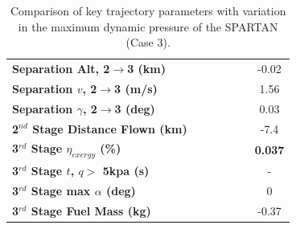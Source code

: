 \begin{table}[ht!]
\begin{tabular}{l c c c c c c}
	\textbf{Separation Alt, 2$\rightarrow$3 (km)}
	& \secondthirdSeparationAltqFortyNoReturn
	& \secondthirdSeparationAltqFortyFiveNoReturn
	& \secondthirdSeparationAltqStandardNoReturn
	& \secondthirdSeparationAltqFiftyFiveNoReturn
	& \secondthirdSeparationAltqSixtyNoReturn
	&-0.02
	\\
	\textbf{Separation $v$, 2$\rightarrow$3 (m/s)}
	& \secondthirdSeparationvqFortyNoReturn
	& \secondthirdSeparationvqFortyFiveNoReturn
	& \secondthirdSeparationvqStandardNoReturn
	& \secondthirdSeparationvqFiftyFiveNoReturn
	& \secondthirdSeparationvqSixtyNoReturn
	&1.56
	\\
	\textbf{Separation $\gamma$, 2$\rightarrow$3 (deg)}
	& \secondthirdSeparationgammaqFortyNoReturn
	& \secondthirdSeparationgammaqFortyFiveNoReturn
	& \secondthirdSeparationgammaqStandardNoReturn
	& \secondthirdSeparationgammaqFiftyFiveNoReturn
	& \secondthirdSeparationgammaqSixtyNoReturn
	&0.03
	\\
	\textbf{2$^{nd}$ Stage Distance Flown (km)}
	& \SecondDistqFortyNoReturn
	& \SecondDistqFortyFiveNoReturn
	& \SecondDistqStandardNoReturn
	& \SecondDistqFiftyFiveNoReturn
	& \SecondDistqSixtyNoReturn
	&-7.4
	\\
	\hline 
	\textbf{3$^{rd}$ Stage $\eta_{exergy}$ (\%)}
	& \textbf{\thirddExergyEffqFortyNoReturn}
	& \textbf{\thirddExergyEffqFortyFiveNoReturn}
	& \textbf{\thirddExergyEffqStandardNoReturn}
	& \textbf{\thirddExergyEffqFiftyFiveNoReturn}
	& \textbf{\thirddExergyEffqSixtyNoReturn}
	& \textbf{0.037}
	\\

	\textbf{3$^{rd}$ Stage $t$, $q >$ 5kpa (s)}
	& \thirdqOverFiveqFortyNoReturn
	& \thirdqOverFiveqFortyFiveNoReturn
	& \thirdqOverFiveqStandardNoReturn
	& \thirdqOverFiveqFiftyFiveNoReturn
	& \thirdqOverFiveqSixtyNoReturn
	& -
	\\
	\textbf{3$^{rd}$ Stage max $\alpha$ (deg)}
	& \thirdmaxAoAqFortyNoReturn
	& \thirdmaxAoAqFortyFiveNoReturn
	& \thirdmaxAoAqStandardNoReturn
	& \thirdmaxAoAqFiftyFiveNoReturn
	& \thirdmaxAoAqSixtyNoReturn
	&0
	\\
	\textbf{3$^{rd}$ Stage Fuel Mass (kg)}
	& \thirdmFuelqFortyNoReturn
	& \thirdmFuelqFortyFiveNoReturn
	& \thirdmFuelqStandardNoReturn
	& \thirdmFuelqFiftyFiveNoReturn
	& \thirdmFuelqSixtyNoReturn
	&-0.37
	\\
	\hline 
\end{tabular}  
	\caption{Comparison of key trajectory parameters with variation in the maximum dynamic pressure of the SPARTAN (Case 3).}
	\label{tab:qvarnoreturn}
\end{table}





